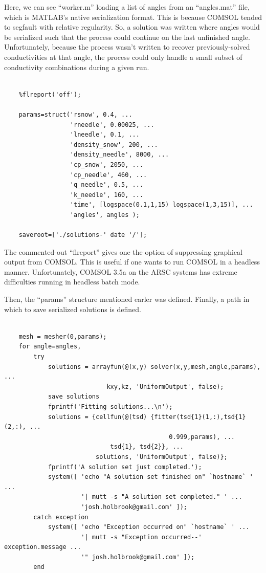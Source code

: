 Here, we can see ``worker.m'' loading a list of angles from an ``angles.mat''
file, which is MATLAB's native serialization format. This is because COMSOL
tended to segfault with relative regularity. So, a
solution was written where angles would be serialized such that the
process could continue on the last unfinished angle. Unfortunately, because the
process wasn't written to recover previously-solved conductivities at that
angle, the process could only handle a small subset of conductivity combinations
during a given run.

\small
\begin{verbatim}

    %flreport('off');

    params=struct('rsnow', 0.4, ...
                  'rneedle', 0.00025, ...
                  'lneedle', 0.1, ...
                  'density_snow', 200, ...
                  'density_needle', 8000, ...
                  'cp_snow', 2050, ...
                  'cp_needle', 460, ...
                  'q_needle', 0.5, ...
                  'k_needle', 160, ...
                  'time', [logspace(0.1,1,15) logspace(1,3,15)], ...
                  'angles', angles );

    saveroot=['./solutions-' date '/'];

\end{verbatim}
\normalsize

The commented-out ``flreport'' gives one the option of suppressing graphical
output from COMSOL. This is useful if one wants to run COMSOL in a headless
manner. Unfortunately, COMSOL 3.5a on the ARSC systems has extreme difficulties
running in headless batch mode.

Then, the ``params'' structure mentioned earler was defined. Finally, a path in
which to save serialized solutions is defined.

\small
\begin{verbatim}

    mesh = mesher(0,params);
    for angle=angles,
        try
            solutions = arrayfun(@(x,y) solver(x,y,mesh,angle,params), ...
                            kxy,kz, 'UniformOutput', false);
            save solutions
            fprintf('Fitting solutions...\n');
            solutions = {cellfun(@(tsd) {fitter(tsd{1}(1,:),tsd{1}(2,:), ...
                                             0.999,params), ...
                             tsd{1}, tsd{2}}, ...
                         solutions, 'UniformOutput', false)};
            fprintf('A solution set just completed.');
            system([ 'echo "A solution set finished on" `hostname` ' ...
                     '| mutt -s "A solution set completed." ' ...
                     'josh.holbrook@gmail.com' ]);
        catch exception
            system([ 'echo "Exception occurred on" `hostname` ' ...
                     '| mutt -s "Exception occurred--' exception.message ...
                     '" josh.holbrook@gmail.com' ]);
        end

\end{verbatim}
\normalsize

